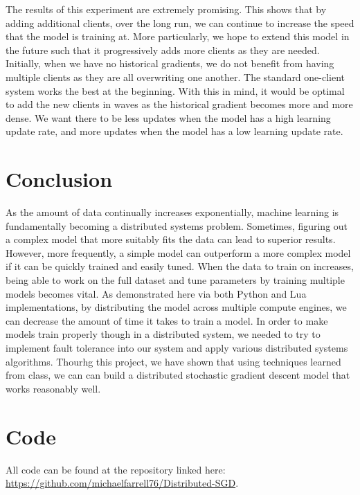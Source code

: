\documentclass[11pt]{article}
\begin{document}
\noindent The results of this experiment are extremely promising. This shows that by adding additional clients, over the long run, we can continue to increase the speed that the model is training at. More particularly, we hope to extend this model in the future such that it progressively adds more clients as they are needed. Initially, when we have no historical gradients, we do not benefit from having multiple clients as they are all overwriting one another. The standard one-client system works the best at the beginning. With this in mind, it would be optimal to add the new clients in waves as the historical gradient becomes more and more dense. We want there to be less updates when the model has a high learning update rate, and more updates when the model has a low learning update rate.


\section{Conclusion}
As the amount of data continually increases exponentially, machine learning is fundamentally becoming a distributed systems problem. Sometimes, figuring out a complex model that more suitably fits the data can lead to superior results. However, more frequently, a simple model can outperform a more complex model if it can be quickly trained and easily tuned. When the data to train on increases, being able to work on the full dataset  and tune parameters by training multiple models becomes vital. As demonstrated here via both Python and Lua implementations, by distributing the model across multiple compute engines, we can decrease the amount of time it takes to train a model. In order to make models train properly though in a distributed system, we needed to try to implement fault tolerance into our system and apply various distributed systems algorithms. Thourhg this project, we have shown that using techniques learned from class, we can can build a distributed stochastic gradient descent model that works reasonably well.

\section{Code}

All code can be found at the repository linked here: \\ \href{https://github.com/michaelfarrell76/Distributed-SGD}{\color{red} https://github.com/michaelfarrell76/Distributed-SGD}.

\printbibliography
\end{document}
